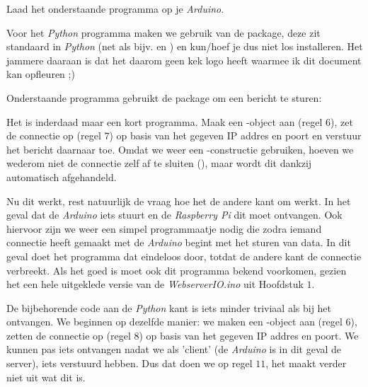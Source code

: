 \begin{exercise}
Laad het onderstaande programma op je \textit{Arduino}. 
\end{exercise}

\newpage



Voor het \textit{Python} programma maken we gebruik van de  package, deze zit standaard in \textit{Python} (net als bijv.  en ) en kun/hoef je dus niet los installeren. Het jammere daaraan is dat het daarom geen kek logo heeft waarmee ik dit document kan opfleuren ;) \newline

Onderstaande programma gebruikt de  package om een bericht te sturen:

Het is inderdaad maar een kort programma. Maak een -object aan (regel $6$), zet de connectie op (regel $7$) op basis van het gegeven IP addres en poort en verstuur het bericht daarnaar toe. Omdat we weer een -constructie gebruiken, hoeven we wederom niet de connectie zelf af te sluiten (), maar wordt dit dankzij  automatisch afgehandeld. \newline \newline

\newpage 

Nu dit werkt, rest natuurlijk de vraag hoe het de andere kant om werkt. In het geval dat de \textit{Arduino} iets stuurt en de \textit{Raspberry Pi} dit moet ontvangen. Ook hiervoor zijn we weer een simpel programmaatje nodig die zodra iemand connectie heeft gemaakt met de \textit{Arduino} begint met het sturen van data. In dit geval doet het programma dat eindeloos door, totdat de andere kant de connectie verbreekt. Als het goed is moet ook dit programma bekend voorkomen, gezien het een hele uitgeklede versie van de \textit{WebserverIO.ino} uit Hoofdstuk $1$.



De bijbehorende code aan de \textit{Python} kant is iets minder triviaal als bij het ontvangen. 
We beginnen op dezelfde manier: we maken een -object aan (regel $6$), zetten de connectie op (regel $8$) op basis van het gegeven IP addres en poort. We kunnen pas iets ontvangen nadat we als 'client' (de \textit{Arduino} is in dit geval de server), iets verstuurd hebben. Dus dat doen we op regel $11$, het maakt verder niet uit wat dit is. \newline


